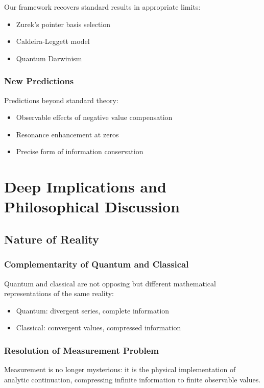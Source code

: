 \documentclass[11pt]{article}
\theoremstyle{plain}
\theoremstyle{definition}
\theoremstyle{remark}
\begin{document}
Our framework recovers standard results in appropriate limits:
\begin{itemize}
\item Zurek's pointer basis selection
\item Caldeira-Leggett model
\item Quantum Darwinism
\end{itemize}

\subsubsection{New Predictions}

Predictions beyond standard theory:
\begin{itemize}
\item Observable effects of negative value compensation
\item Resonance enhancement at zeros
\item Precise form of information conservation
\end{itemize}

\section{Deep Implications and Philosophical Discussion}

\subsection{Nature of Reality}

\subsubsection{Complementarity of Quantum and Classical}

Quantum and classical are not opposing but different mathematical representations of the same reality:
\begin{itemize}
\item Quantum: divergent series, complete information
\item Classical: convergent values, compressed information
\end{itemize}

\subsubsection{Resolution of Measurement Problem}

Measurement is no longer mysterious: it is the physical implementation of analytic continuation, compressing infinite information to finite observable values.
\end{document}
